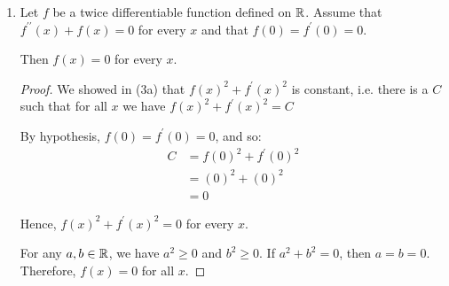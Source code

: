 \documentclass[12pt, letterpaper]{article}
\begin{document}
\begin{enumerate}[label=\bfseries3\alph*)]
\item Let $f$ be a twice differentiable function defined on $\mathbb{R}$. Assume that 
$f^{\prime\prime}(x) + f(x) = 0$ for every $x$ and that $f(0) = f^\prime(0) = 0$. 

Then $f(x) = 0$ for every $x$.

\begin{proof}
    We showed in (3a) that $f(x)^2 + f^\prime(x)^2$ is constant, i.e. there 
    is a $C$ such that for all $x$ we have $f(x)^2 + f^\prime(x)^2=C$ 

    By hypothesis, $f(0) = f^\prime(0) = 0$, and so:
    \begin{align*}
    C   &= f(0)^2 + f^\prime(0)^2 \\
        &= (0)^2 + (0)^2 \\
        &= 0   
    \end{align*}

    Hence, $f(x)^2 + f^\prime(x)^2 = 0$ for every $x$.

    For any $a,b \in \mathbb{R}$, we have $a^2 \geq 0$ and $b^2 \geq 0$. If $a^2 + b^2 = 0$, then
    $a=b=0$. Therefore, $f(x)=0$ for all $x$.
\end{proof}
\end{enumerate}
\end{document}
